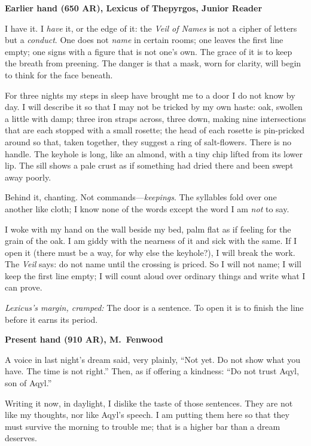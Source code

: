 \documentclass[11pt]{article}
\begin{document}
\medskip
\noindent\textbf{Earlier hand (650 AR), Lexicus of Thepyrgos, Junior Reader}

I have it. I \emph{have} it, or the edge of it: the \textit{Veil of Names} is not a cipher of letters but a \emph{conduct}. One does not \emph{name} in certain rooms; one leaves the first line empty; one signs with a figure that is not one’s own. The grace of it is to keep the breath from preening. The danger is that a mask, worn for clarity, will begin to think for the face beneath.

For three nights my steps in sleep have brought me to a door I do not know by day. I will describe it so that I may not be tricked by my own haste: oak, swollen a little with damp; three iron straps across, three down, making nine intersections that are each stopped with a small rosette; the head of each rosette is pin-pricked around so that, taken together, they suggest a ring of salt-flowers. There is no handle. The keyhole is long, like an almond, with a tiny chip lifted from its lower lip. The sill shows a pale crust as if something had dried there and been swept away poorly.

Behind it, chanting. Not commands—\emph{keepings}. The syllables fold over one another like cloth; I know none of the words except the word I am \emph{not} to say.

I woke with my hand on the wall beside my bed, palm flat as if feeling for the grain of the oak. I am giddy with the nearness of it and sick with the same. If I open it (there must be a way, for why else the keyhole?), I will break the work. The \textit{Veil} says: do not name until the crossing is priced. So I will not name; I will keep the first line empty; I will count aloud over ordinary things and write what I can prove.

\medskip
\noindent\textit{Lexicus’s margin, cramped:} The door is a sentence. To open it is to finish the line before it earns its period.

\medskip
\noindent\textbf{Present hand (910 AR), M.\ Fenwood}

A voice in last night’s dream said, very plainly, ``Not yet. Do not show what you have. The time is not right.'' Then, as if offering a kindness: ``Do not trust Aqyl, son of Aqyl.''

Writing it now, in daylight, I dislike the taste of those sentences. They are not like my thoughts, nor like Aqyl’s speech. I am putting them here so that they must survive the morning to trouble me; that is a higher bar than a dream deserves.
\end{document}
